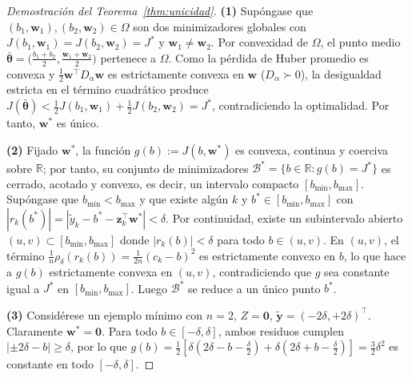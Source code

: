 \begin{proof}[Demostración del Teorema~\ref{thm:unicidad}]
\textbf{(1)} Supóngase que $(b_1, \mathbf{w}_1), (b_2, \mathbf{w}_2) \in \Omega$ son dos minimizadores globales con $J(b_1,\mathbf{w}_1) = J(b_2,\mathbf{w}_2) = J^*$ y $\mathbf{w}_1 \ne \mathbf{w}_2$. Por convexidad de $\Omega$, el punto medio $\bar{\boldsymbol{\theta}} = \big(\frac{b_1+b_2}{2}, \frac{\mathbf{w}_1+\mathbf{w}_2}{2}\big)$ pertenece a $\Omega$. Como la pérdida de Huber promedio es convexa y $\frac{1}{2}\mathbf{w}^\top D_\alpha \mathbf{w}$ es estrictamente convexa en $\mathbf{w}$ ($D_\alpha \succ 0$), la desigualdad estricta en el término cuadrático produce $J(\bar{\boldsymbol{\theta}}) < \frac{1}{2}J(b_1,\mathbf{w}_1) + \frac{1}{2}J(b_2,\mathbf{w}_2) = J^*$, contradiciendo la optimalidad. Por tanto, $\mathbf{w}^*$ es único.

\textbf{(2)} Fijado $\mathbf{w}^*$, la función $g(b) := J(b, \mathbf{w}^*)$ es convexa, continua y coerciva sobre $\mathbb{R}$; por tanto, su conjunto de minimizadores $\mathcal{B}^* = \{b \in \mathbb{R} : g(b) = J^*\}$ es cerrado, acotado y convexo, es decir, un intervalo compacto $[b_{\min}, b_{\max}]$. Supóngase que $b_{\min} < b_{\max}$ y que existe algún $k$ y $b^* \in [b_{\min}, b_{\max}]$ con $|r_k(b^*)| = |\tilde{y}_k - b^* - \mathbf{z}_k^\top \mathbf{w}^*| < \delta$. Por continuidad, existe un subintervalo abierto $(u, v) \subset [b_{\min}, b_{\max}]$ donde $|r_k(b)| < \delta$ para todo $b \in (u,v)$. En $(u,v)$, el término $\frac{1}{n}\rho_\delta(r_k(b)) = \frac{1}{2n}(c_k - b)^2$ es estrictamente convexo en $b$, lo que hace a $g(b)$ estrictamente convexa en $(u,v)$, contradiciendo que $g$ sea constante igual a $J^*$ en $[b_{\min}, b_{\max}]$. Luego $\mathcal{B}^*$ se reduce a un único punto $b^*$.

\textbf{(3)} Considérese un ejemplo mínimo con $n=2$, $Z = \mathbf{0}$, $\tilde{\mathbf{y}} = (-2\delta, +2\delta)^\top$. Claramente $\mathbf{w}^* = \mathbf{0}$. Para todo $b \in [-\delta, \delta]$, ambos residuos cumplen $|\pm 2\delta - b| \ge \delta$, por lo que $g(b) = \frac{1}{2}[\delta(2\delta - b - \frac{\delta}{2}) + \delta(2\delta + b - \frac{\delta}{2})] = \frac{3}{2}\delta^2$ es constante en todo $[-\delta, \delta]$.
\end{proof}

